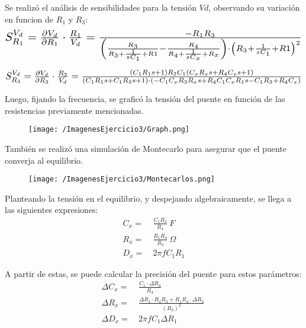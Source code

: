 Se realizó el análisis de sensibilidades para la tensión $Vd$, observando su variación en funcion de $R_1$ y $R_3$:
\begin{align*}
\scalebox{1.5}{$
S_{R_1}^{V_d} = \frac{\partial V_d}{\partial R_1} \cdot \frac{R_1}{V_d}=
\frac{-R_1R_3}{\left( \frac{R_3}{R_3+\frac{1}{sC_1}+R1}-\frac{R_4}{R_4+\frac{1}{sC_x}+R_x} \right) \cdot  \left( R_3+\frac{1}{sC_1}+R1\right)^2}
$}
\end{align*}

\begin{align*}
\scalebox{1.5}{$
S_{R_3}^{V_d} = \frac{\partial V_d}{\partial R_3} \cdot \frac{R_3}{V_d}=\frac{(C_1R_1s+1)R_3C_1(C_xR_xs+R_4C_xs+1)}{(C_1R_1s+C_1R_3s+1)\cdot (-C_1C_xR_3R_xs+R_4C_1C_xR_1s-C_1R_3+R_4C_x)}
$}
\end{align*}

Luego, fijando la frecuencia, se graficó la tensión del puente en función de las resistencias previamente mencionadas.
\begin{figure}[H]
	\centering
	\texttt{[image: /ImagenesEjercicio3/Graph.png]}
	\label{fig:graph}
\end{figure}

También se realizó una simulación de Montecarlo para asegurar que el puente converja al equilibrio.
\begin{figure}[H]
	\centering
	\texttt{[image: /ImagenesEjercicio3/Montecarlos.png]}
	\label{fig:graph}
\end{figure}

Planteando la tensión en el equilibrio, y despejando algebraicamente, se llega a las siguientes expresiones:
\begin{equation*}
\begin{split}
	C_{x} =& \ \frac{C_1R_3}{R_4}\ F \\
	R_{x} =& \ \frac{R_1R_4}{R_3}\ \Omega \\
	D_{x} =& \ 2\pi f C_1R_1 
\end{split}
\end{equation*}

A partir de estas, se puede calcular la precisión del puente para estos parámetros:
\begin{equation*}
\begin{split}
	\Delta C_{x} =& \ \frac{C_1 \cdot \Delta R_3}{R_4}\  \\
	\Delta R_{x} =& \ \frac{\Delta R_1 \cdot R_4  R_3+R_1  R_4 \cdot \Delta R_3}{(R_3)^2}\  \\
	\Delta D_{x} =& \ 2\pi f C_1 \Delta R_1 
\end{split}
\end{equation*}

